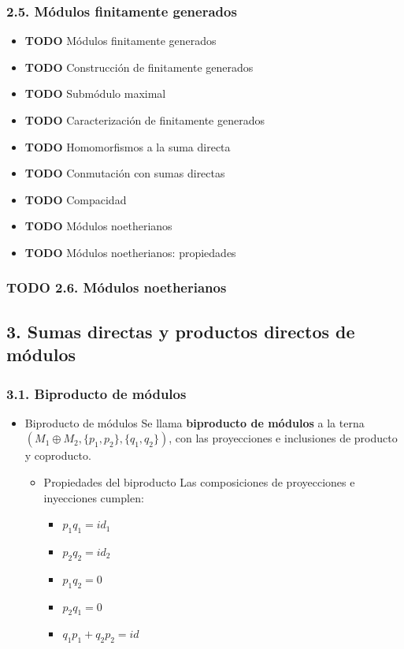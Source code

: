 \documentclass[11pt]{article}
\begin{document}
\subsubsection*{2.5. Módulos finitamente generados}
\label{sec-7-2-4}
\begin{itemize}
\item {\bfseries\sffamily TODO} Módulos finitamente generados
\label{sec-7-2-4-1}
\item {\bfseries\sffamily TODO} Construcción de finitamente generados
\label{sec-7-2-4-2}
\item {\bfseries\sffamily TODO} Submódulo maximal
\label{sec-7-2-4-3}
\item {\bfseries\sffamily TODO} Caracterización de finitamente generados
\label{sec-7-2-4-4}
\item {\bfseries\sffamily TODO} Homomorfismos a la suma directa
\label{sec-7-2-4-5}
\item {\bfseries\sffamily TODO} Conmutación con sumas directas
\label{sec-7-2-4-6}
\item {\bfseries\sffamily TODO} Compacidad
\label{sec-7-2-4-7}
\item {\bfseries\sffamily TODO} Módulos noetherianos
\label{sec-7-2-4-8}
\item {\bfseries\sffamily TODO} Módulos noetherianos: propiedades
\label{sec-7-2-4-9}
\end{itemize}
\subsubsection*{{\bfseries\sffamily TODO} 2.6. Módulos noetherianos}
\label{sec-7-2-5}
\subsection*{3. Sumas directas y productos directos de módulos}
\label{sec-7-3}
\subsubsection*{3.1. Biproducto de módulos}
\label{sec-7-3-1}
\begin{itemize}
\item Biproducto de módulos
\label{sec-7-3-1-1}
Se llama \textbf{biproducto de módulos} a la terna $(M_1\oplus M_2, \{p_1,p_2\}, \{q_1,q_2\})$,
con las proyecciones e inclusiones de producto y coproducto.

\begin{itemize}
\item Propiedades del biproducto
\label{sec-7-3-1-1-1}
Las composiciones de proyecciones e inyecciones cumplen:

\begin{itemize}
\item $p_1q_1 = id_1$
\item $p_2q_2 = id_2$
\item $p_1q_2 = 0$
\item $p_2q_1 = 0$
\item $q_1p_1 + q_2p_2 = id$
\end{itemize}
\end{itemize}
\end{itemize}
\end{document}
